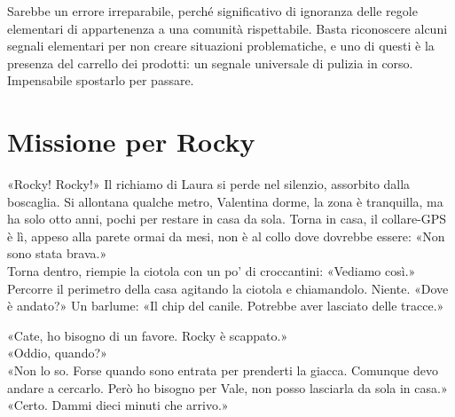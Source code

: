 \documentclass[10pt,oneside]{extbook}
\begin{document}
\par\medskip
Sarebbe un errore irreparabile, perch\'e significativo di ignoranza delle regole elementari di appartenenza a una comunità rispettabile. Basta riconoscere alcuni segnali elementari per non creare situazioni problematiche, e uno di questi \`e la presenza del carrello dei prodotti: un segnale universale di pulizia in corso. Impensabile spostarlo per passare.
\clearpage{}
\clearpage{}\chapter{Missione per Rocky}

«Rocky! Rocky!» Il richiamo di Laura si perde nel silenzio, assorbito dalla boscaglia. Si allontana qualche metro, Valentina dorme, la zona \`e tranquilla, ma ha solo otto anni, pochi per restare in casa da sola. Torna in casa, il collare-GPS \`e l\`i, appeso alla parete ormai da mesi, non \`e al collo dove dovrebbe essere: «Non sono stata brava.»\\
Torna dentro, riempie la ciotola con un po' di croccantini: «Vediamo cos\`i.» Percorre il perimetro della casa agitando la ciotola e chiamandolo. Niente. «Dove \`e andato?» Un barlume: «Il chip del canile. Potrebbe aver lasciato delle tracce.»


\par\medskip
«Cate, ho bisogno di un favore. Rocky \`e scappato.»\\
«Oddio, quando?»\\
«Non lo so. Forse quando sono entrata per prenderti la giacca. Comunque devo andare a cercarlo. Però ho bisogno per Vale, non posso lasciarla da sola in casa.»\\
«Certo. Dammi dieci minuti che arrivo.»
\end{document}

